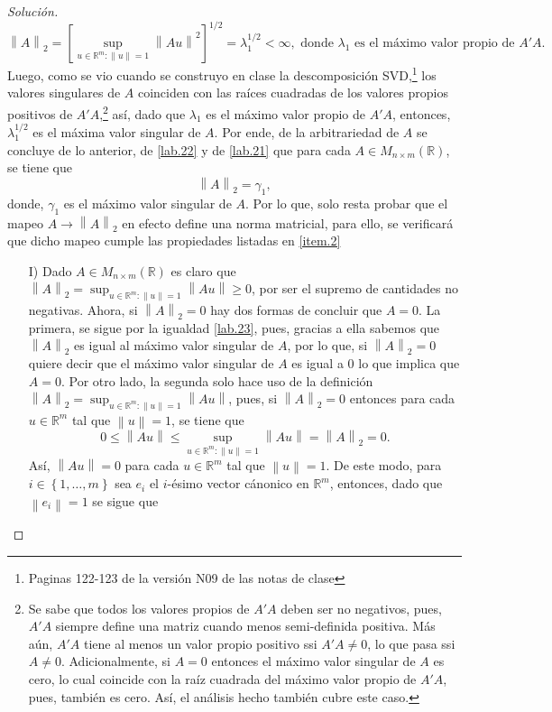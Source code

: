 \documentclass[10.5pt,notitlepage]{article}
\newenvironment{solucion}
  {\begin{proof}[Solución]}
  {\end{proof}}
\newcommand{\RR}{\mathbb{R}}
\newcommand{\norm}[1]{\left\| #1 \right\|}
\newcommand{\corch}[1]{\left[ #1 \right]}
\newcommand{\kis}[1]{\left\{ #1 \right\}}
\theoremstyle{plain}
\begin{document}
\begin{solucion}
\[
  \norm{A}_{2}  =  \corch{ \sup_{u\in \RR^{m}: \norm{u} = 1}\norm{Au}^2}^{1/2} = \lambda_{1}^{1/2} < \infty, \text{ donde } \lambda_1 \text{ es el máximo valor propio de } A'A. 
\]
Luego, como se vio cuando se construyo en clase la descomposición SVD,\footnote{Paginas 122-123 de la versión N09 de las notas de clase} los valores singulares de \(A\) coinciden con las raíces cuadradas de los valores propios positivos de \(A'A\),\footnote{Se sabe que todos los valores propios de \(A'A\) deben ser no negativos, pues, \(A'A\) siempre define una matriz cuando menos semi-definida positiva. Más aún, \(A'A\) tiene al menos un valor propio positivo ssi \(A'A \neq 0\), lo que pasa ssi \(A \neq 0\). Adicionalmente, si \(A = 0\) entonces el máximo valor singular de \(A\) es cero, lo cual coincide con la raíz cuadrada del máximo valor propio de \(A'A\), pues, también es cero. Así, el análisis hecho también cubre este caso.} así, dado que \(\lambda_1\) es el máximo valor propio de \(A'A\), entonces, \(\lambda_1^{1/2}\) es el máxima valor singular de \(A\). Por ende, de la arbitrariedad de \(A\) se concluye de lo anterior, de \eqref{lab.22} y de \eqref{lab.21} que para cada \(A \in M_{n \times m}(\RR)\), se tiene que 
\begin{equation}\label{lab.23}
    \norm{A}_{2} = \gamma_1,
\end{equation}
donde, \(\gamma_1\) es el máximo valor singular de \(A\). Por lo que, solo resta probar que el mapeo \(A \to \norm{A}_{2}\) en efecto define una norma matricial, para ello, se verificará que dicho mapeo cumple las propiedades listadas en \ref{item.2} 
\begin{itemize}
    \item[I)] Dado \(A \in M_{n \times m}(\RR)\) es claro que \(\norm{A}_{2} =   \sup_{u\in \RR^{m}: \norm{u} = 1}\norm{Au} \geq 0\), por ser el supremo de cantidades no negativas.  Ahora, si \(\norm{A}_2 = 0\) hay dos formas de concluir que \(A = 0\). La primera, se sigue por la igualdad \eqref{lab.23}, pues, gracias a ella sabemos que \(\norm{A}_2\) es igual al máximo valor singular de \(A\), por lo que, si \(\norm{A}_2 = 0\) quiere decir que el máximo valor singular de \(A\) es igual a \(0\) lo que implica que \(A=0\). Por otro lado, la segunda solo hace uso de la definición \( \norm{A}_{2} =  \sup_{u\in \RR^{m}: \norm{u} = 1}\norm{Au}\), pues, si \(\norm{A}_{2} = 0\) entonces para cada \(u \in \RR^{m}\) tal que \(\norm{u} = 1\), se tiene que 
    \[
    0 \leq \norm{Au } \leq  \sup_{u\in \RR^{m}: \norm{u} = 1}\norm{Au} =  \norm{A}_{2} =0.
    \]
    Así, \(\norm{Au } = 0\) para cada \(u \in \RR^{m}\) tal que \(\norm{u} = 1\). De este modo, para \(i \in \kis{1, \hdots,m}\) sea \(e_i\) el \(i\)-ésimo vector cánonico en \(\RR^m\), entonces, dado que \(\norm{e_i} = 1\) se sigue que 

\end{itemize}
\end{solucion}
\end{document}
